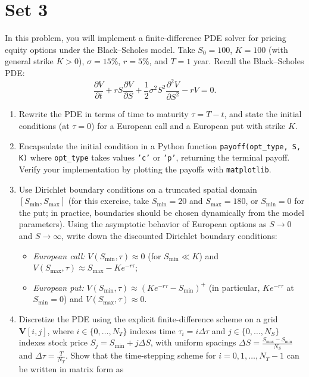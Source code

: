 \section{Set 3}
\begin{problem}
    In this problem, you will implement a finite-difference PDE solver for pricing equity options under the Black--Scholes model. Take $S_0 = 100$, $K = 100$ (with general strike $K > 0$), $\sigma = 15\%$, $r = 5\%$, and $T = 1$ year. Recall the Black--Scholes PDE:
    \[
    \frac{\partial V}{\partial t} + r S\frac{\partial V}{\partial S} + \frac{1}{2}\sigma^2 S^2\frac{\partial^2 V}{\partial S^2} - r V = 0.
    \]
    \begin{enumerate}
        \item Rewrite the PDE in terms of time to maturity $\tau = T - t$, and state the initial conditions (at $\tau = 0$) for a European call and a European put with strike $K$.
        \item Encapsulate the initial condition in a Python function \texttt{payoff(opt\_type, S, K)} where \texttt{opt\_type} takes values \texttt{'c'} or \texttt{'p'}, returning the terminal payoff. Verify your implementation by plotting the payoffs with \texttt{matplotlib}.
        \item Use Dirichlet boundary conditions on a truncated spatial domain $[S_{\min}, S_{\max}]$ (for this exercise, take $S_{\min} = 20$ and $S_{\max} = 180$, or $S_{\min} = 0$ for the put; in practice, boundaries should be chosen dynamically from the model parameters). Using the asymptotic behavior of European options as $S \to 0$ and $S \to \infty$, write down the discounted Dirichlet boundary conditions:
        \begin{itemize}
            \item \emph{European call:} $V(S_{\min}, \tau) \approx 0$ (for $S_{\min} \ll K$) and $V(S_{\max}, \tau) \approx S_{\max} - K e^{-r\tau}$;
            \item \emph{European put:} $V(S_{\min}, \tau) \approx (K e^{-r\tau} - S_{\min})^{+}$ (in particular, $K e^{-r\tau}$ at $S_{\min} = 0$) and $V(S_{\max}, \tau) \approx 0$.
        \end{itemize}
        \item Discretize the PDE using the explicit finite-difference scheme on a grid $\mathbf{V}[i, j]$, where $i \in \{0, \ldots, N_T\}$ indexes time $\tau_i = i\Delta\tau$ and $j \in \{0, \ldots, N_S\}$ indexes stock price $S_j = S_{\min} + j\Delta S$, with uniform spacings $\Delta S = \frac{S_{\max} - S_{\min}}{N_S}$ and $\Delta\tau = \frac{T}{N_T}$. Show that the time-stepping scheme for $i = 0, 1, \ldots, N_T - 1$ can be written in matrix form as

\end{enumerate}
\end{problem}
